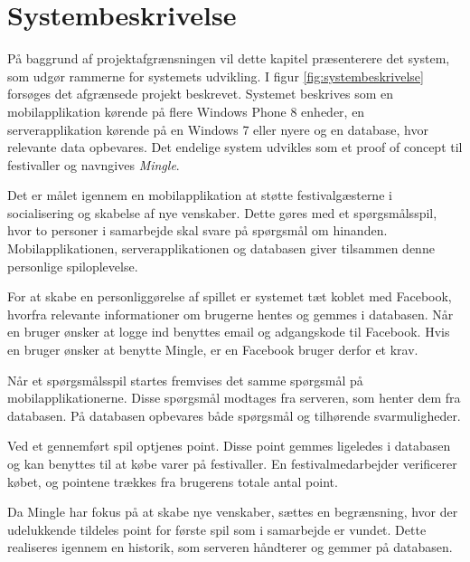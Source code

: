 \thispagestyle{fancy}
\chapter{Systembeskrivelse}
\label{chp:systembeskrivelse}
På baggrund af projektafgrænsningen vil dette kapitel præsenterere det system, som udgør rammerne for systemets udvikling. I figur \ref{fig:systembeskrivelse} forsøges det afgrænsede projekt beskrevet. Systemet beskrives som en mobilapplikation kørende på flere Windows Phone 8 enheder, en serverapplikation kørende på en Windows 7 eller nyere og en database, hvor relevante data opbevares. Det endelige system udvikles som et proof of concept til festivaller og navngives \textit{Mingle}.


Det er målet igennem en mobilapplikation at støtte festivalgæsterne i socialisering og skabelse af nye venskaber. Dette gøres med et spørgsmålsspil, hvor to personer i samarbejde skal svare på spørgsmål om hinanden. Mobilapplikationen, serverapplikationen og databasen giver tilsammen denne personlige spiloplevelse.

For at skabe en personliggørelse af spillet er systemet tæt koblet med Facebook, hvorfra relevante informationer om brugerne hentes og gemmes i databasen. Når en bruger ønsker at logge ind benyttes email og adgangskode til Facebook. Hvis en bruger ønsker at benytte Mingle, er en Facebook bruger derfor et krav. 

Når et spørgsmålsspil startes fremvises det samme spørgsmål på mobilapplikationerne. Disse spørgsmål modtages fra serveren, som henter dem fra databasen. På databasen opbevares både spørgsmål og tilhørende svarmuligheder.

Ved et gennemført spil optjenes point. Disse point gemmes ligeledes i databasen og kan benyttes til at købe varer på festivaller. En festivalmedarbejder  verificerer købet, og pointene trækkes fra brugerens totale antal point.


Da Mingle har fokus på at skabe nye venskaber, sættes en begrænsning, hvor der udelukkende tildeles point for første spil som i samarbejde er vundet. Dette realiseres igennem en historik, som serveren håndterer og gemmer på databasen.






 

 
